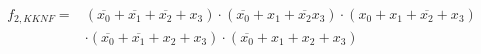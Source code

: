 \documentclass[a4paper]{article}
\begin{document}
\begin{enumerate}[label=\alph*)]
	\begin{equation*}
	\begin{aligned}
		f_{2, KKNF} = &(\overline{x_0} + \overline{x_1} + \overline{x_2} + x_3) \cdot (\overline{x_0} + x_1 + \overline{x_2} x_3) \cdot (x_0 + x_1 + \overline{x_2} + x_3)\\ &\cdot (\overline{x_0} + \overline{x_1} + x_2 + x_3) \cdot (\overline{x_0} + x_1 + x_2 + x_3)
	\end{aligned}
	\end{equation*}
\end{enumerate}
\end{document}
